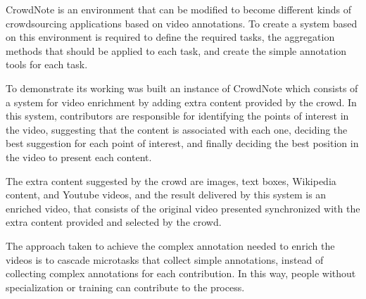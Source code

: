 CrowdNote is an environment that can be modified to become different kinds of crowdsourcing applications based on video annotations. To create a system based on this environment is required to define the required tasks, the aggregation methods that should be applied to each task, and create the simple annotation tools for each task.

To demonstrate its working was built an instance of CrowdNote which consists of a system for video enrichment by adding extra content provided by the crowd. In this system, contributors are responsible for identifying the points of interest in the video, suggesting that the content is associated with each one, deciding the best suggestion for each point of interest, and finally deciding the best position in the video to present each content.

The extra content suggested by the crowd are images, text boxes, Wikipedia content, and Youtube videos, and the result delivered by this system is an enriched video, that consists of the original video presented synchronized with the extra content provided and selected by the crowd. 

The approach taken to achieve the complex annotation needed to enrich the videos is to cascade microtasks that collect simple annotations, instead of collecting complex annotations for each contribution. In this way, people without specialization or training can contribute to the process.


